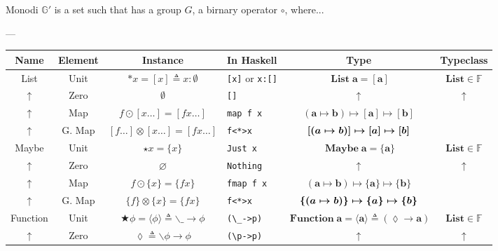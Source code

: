 \documentclass{jsarticle}
\newcommand{\boldsym}[1]{{\boldsymbol{#1}}}
\newcommand{\htypename}[1]{\mathbf{#1}}
\newcommand{\htypeclassname}[1]{\mathbb{#1}}
\begin{document}
Monodi $\htypeclassname{G}'$ is a set such that has a group $G$, a birnary operator $\circ$, where...

---


\begin{center}
\begin{tabular}{||c|c||c|l|c|c||}\hline
Name&Element&Instance&In Haskell&Type&Typeclass\\\hline
\hline
List
    &Unit
    &$\ast x=[x]\triangleq x:\emptyset$
    &\texttt{[x]} or \texttt{x:[]}
    &$\mathop{\textbf{List}}\htypename{a}=\boldsym{[a]}$
    &$\textbf{List}\in\htypeclassname{F}$\\
    \hline
$\uparrow$
    &Zero
    &$\emptyset$
    &\texttt{[]}
    &$\uparrow$
    &$\uparrow$\\
    \hline
$\uparrow$
    &Map
    &$f\odot[x\dots]=[fx\dots]$
    &\texttt{map f x}
    &$(\htypename{a}\mapsto\htypename{b})\mapsto\boldsym{[a]}\mapsto\boldsym{[b]}$
    &\\
    \hline
$\uparrow$
    &G. Map
    &$[f\dots]\otimes[x\dots]=[fx\dots]$
    &\texttt{f<*>x}
    &$\boldsym{[}(\boldmath{a}\mapsto\boldmath{b})\boldsym{]}\mapsto\boldsym{[a]}\mapsto\boldsym{[b]}$
    &\\
    \hline
    \hline
Maybe
    &Unit
    &$\star x=\{x\}$
    &\texttt{Just x}
    &$\mathop{\textbf{Maybe}}\htypename{a}=\boldsym{\{a\}}$
    &$\textbf{List}\in\htypeclassname{F}$\\
    \hline
$\uparrow$
    &Zero
    &$\varnothing$
    &\texttt{Nothing}
    &$\uparrow$
    &$\uparrow$\\
    \hline
$\uparrow$
    &Map
    &$f\odot\{x\}=\{fx\}$
    &\texttt{fmap f x}
    &$(\htypename{a}\mapsto\htypename{b})\mapsto\boldsym{\{a\}}\mapsto\boldsym{\{b\}}$
    &\\
    \hline
$\uparrow$
    &G. Map
    &$\{f\}\otimes\{x\}=\{fx\}$
    &\texttt{f<*>x}
    &$\boldsym{\{}(\boldmath{a}\mapsto\boldmath{b})\boldsym{\}}\mapsto\boldsym{\{a\}}\mapsto\boldsym{\{b\}}$
    &\\
    \hline
    \hline
Function
    &Unit
    &$\bigstar\phi=\langle\phi\rangle\triangleq \backslash\_\longrightarrow\phi$
    &\verb|(\_->p)|
    &$\mathop{\textbf{Function}}\htypename{a}=\boldsym{\langle a\rangle}\triangleq(\lozenge\rightarrow\htypename{a})$
    &$\textbf{List}\in\htypeclassname{F}$\\
    \hline
$\uparrow$
    &Zero
    &$\lozenge\triangleq\backslash\phi\longrightarrow\phi$
    &\verb|(\p->p)|
    &$\uparrow$
    &$\uparrow$\\

\end{tabular}
\end{center}
\end{document}
